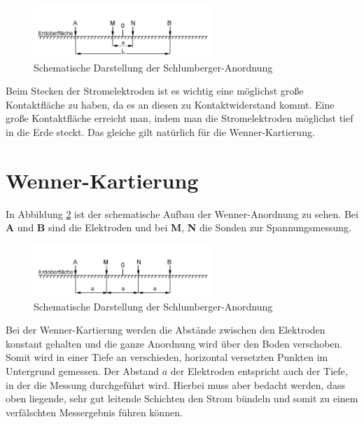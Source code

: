 \begin{figure}[ht]
\centering
\includegraphics[width=0.6\textwidth]{Schlumberger.png}
\caption{Schematische Darstellung der Schlumberger-Anordnung}
\label{abb:Schlumberger}
\end{figure}

Beim Stecken der Stromelektroden ist es wichtig eine möglichst große Kontaktfläche zu haben, da es an diesen zu Kontaktwiderstand kommt. Eine große Kontaktfläche erreicht man, indem man die Stromelektroden möglichst tief in die Erde steckt. 
Das gleiche gilt natürlich für die Wenner-Kartierung.

\section{Wenner-Kartierung}

In Abbildung \ref{abb:Wenner} ist der schematische Aufbau der Wenner-Anordnung zu sehen. Bei \textbf{A} und \textbf{B} sind die Elektroden und bei \textbf{M}, \textbf{N} die Sonden zur Spannungsmessung.

\begin{figure}[ht]
\centering
\includegraphics[width=0.6\textwidth]{Wenner.png}
\caption{Schematische Darstellung der Schlumberger-Anordnung}
\label{abb:Wenner}
\end{figure}

Bei der Wenner-Kartierung werden die Abstände zwischen den Elektroden konstant gehalten und die ganze Anordnung wird über den Boden verschoben. Somit wird in einer Tiefe an verschieden, horizontal versetzten Punkten im Untergrund gemessen. Der Abstand $a$ der Elektroden entspricht auch der Tiefe, in der die Messung durchgeführt wird.
Hierbei muss aber bedacht werden, dass oben liegende, sehr gut leitende Schichten den Strom bündeln und somit zu einem verfälschten Messergebnis führen können.

